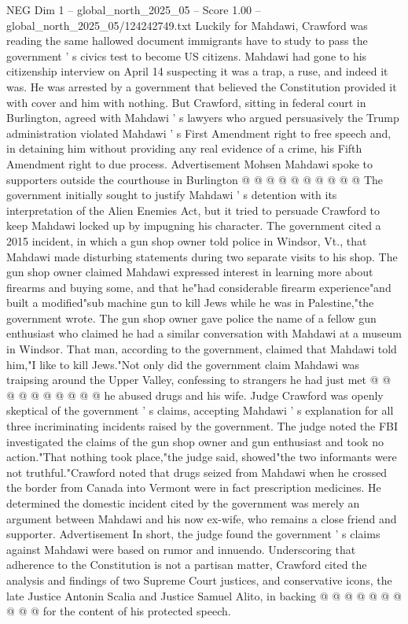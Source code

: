 \begin{textsample}{NEG Dim 1 – global\_north\_2025\_05 – Score 1.00 – global\_north\_2025\_05/124242749.txt}
Luckily for Mahdawi, Crawford was reading the same hallowed document immigrants have to study to pass the government ' s civics test to become US citizens.
Mahdawi had gone to his citizenship interview on April 14 suspecting it was a trap, a ruse, and indeed it was.
He was arrested by a government that believed the Constitution provided it with cover and him with nothing.
But Crawford, sitting in federal court in Burlington, agreed with Mahdawi ' s lawyers who argued persuasively the Trump administration violated Mahdawi ' s First Amendment right to free speech and, in detaining him without providing any real evidence of a crime, his Fifth Amendment right to due process.
Advertisement Mohsen Mahdawi spoke to supporters outside the courthouse in Burlington @ @ @ @ @ @ @ @ @ @ The government initially sought to justify Mahdawi ' s detention with its interpretation of the Alien Enemies Act, but it tried to persuade Crawford to keep Mahdawi locked up by impugning his character.
The government cited a 2015 incident, in which a gun shop owner told police in Windsor, Vt., that Mahdawi made disturbing statements during two separate visits to his shop.
The gun shop owner claimed Mahdawi expressed interest in learning more about firearms and buying some, and that he"had considerable firearm experience"and built a modified"sub machine gun to kill Jews while he was in Palestine,"the government wrote.
The gun shop owner gave police the name of a fellow gun enthusiast who claimed he had a similar conversation with Mahdawi at a museum in Windsor.
That man, according to the government, claimed that Mahdawi told him,"I like to kill Jews."Not only did the government claim Mahdawi was traipsing around the Upper Valley, confessing to strangers he had just met @ @ @ @ @ @ @ @ @ @ he abused drugs and his wife.
Judge Crawford was openly skeptical of the government ' s claims, accepting Mahdawi ' s explanation for all three incriminating incidents raised by the government.
The judge noted the FBI investigated the claims of the gun shop owner and gun enthusiast and took no action."That nothing took place,"the judge said, showed"the two informants were not truthful."Crawford noted that drugs seized from Mahdawi when he crossed the border from Canada into Vermont were in fact prescription medicines.
He determined the domestic incident cited by the government was merely an argument between Mahdawi and his now ex-wife, who remains a close friend and supporter.
Advertisement In short, the judge found the government ' s claims against Mahdawi were based on rumor and innuendo.
Underscoring that adherence to the Constitution is not a partisan matter, Crawford cited the analysis and findings of two Supreme Court justices, and conservative icons, the late Justice Antonin Scalia and Justice Samuel Alito, in backing @ @ @ @ @ @ @ @ @ @ for the content of his protected speech.

\end{textsample}
